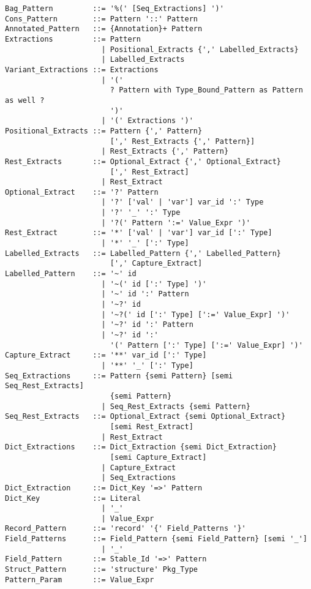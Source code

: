 \begin{lstlisting}[deletekeywords={as,with}]
Bag_Pattern         ::= '%(' [Seq_Extractions] ')'
Cons_Pattern        ::= Pattern '::' Pattern
Annotated_Pattern   ::= {Annotation}+ Pattern
Extractions         ::= Pattern 
                      | Positional_Extracts {',' Labelled_Extracts}
                      | Labelled_Extracts
Variant_Extractions ::= Extractions
                      | '(' 
                        ? Pattern with Type_Bound_Pattern as Pattern as well ? 
                        ')'
                      | '(' Extractions ')'
Positional_Extracts ::= Pattern {',' Pattern} 
                        [',' Rest_Extracts {',' Pattern}]
                      | Rest_Extracts {',' Pattern}
Rest_Extracts       ::= Optional_Extract {',' Optional_Extract} 
                        [',' Rest_Extract]
                      | Rest_Extract
Optional_Extract    ::= '?' Pattern
                      | '?' ['val' | 'var'] var_id ':' Type
                      | '?' '_' ':' Type
                      | '?(' Pattern ':=' Value_Expr ')'
Rest_Extract        ::= '*' ['val' | 'var'] var_id [':' Type]
                      | '*' '_' [':' Type]
Labelled_Extracts   ::= Labelled_Pattern {',' Labelled_Pattern} 
                        [',' Capture_Extract]
Labelled_Pattern    ::= '~' id 
                      | '~(' id [':' Type] ')'
                      | '~' id ':' Pattern
                      | '~?' id
                      | '~?(' id [':' Type] [':=' Value_Expr] ')'
                      | '~?' id ':' Pattern
                      | '~?' id ':' 
                        '(' Pattern [':' Type] [':=' Value_Expr] ')'
Capture_Extract     ::= '**' var_id [':' Type]
                      | '**' '_' [':' Type]
Seq_Extractions     ::= Pattern {semi Pattern} [semi Seq_Rest_Extracts] 
                        {semi Pattern}
                      | Seq_Rest_Extracts {semi Pattern}
Seq_Rest_Extracts   ::= Optional_Extract {semi Optional_Extract} 
                        [semi Rest_Extract]
                      | Rest_Extract
Dict_Extractions    ::= Dict_Extraction {semi Dict_Extraction}
                        [semi Capture_Extract]
                      | Capture_Extract
                      | Seq_Extractions
Dict_Extraction     ::= Dict_Key '=>' Pattern
Dict_Key            ::= Literal
                      | '_'
                      | Value_Expr
Record_Pattern      ::= 'record' '{' Field_Patterns '}'
Field_Patterns      ::= Field_Pattern {semi Field_Pattern} [semi '_']
                      | '_'
Field_Pattern       ::= Stable_Id '=>' Pattern
Struct_Pattern      ::= 'structure' Pkg_Type
Pattern_Param       ::= Value_Expr
\end{lstlisting}

